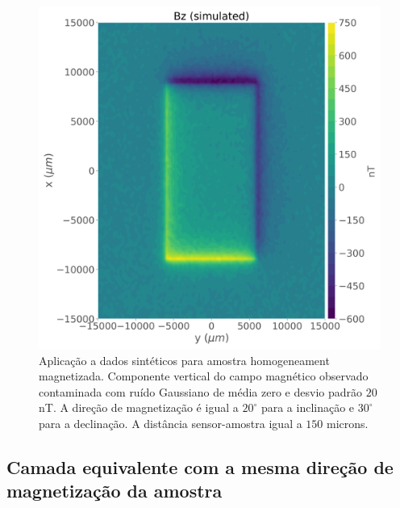 \begin{figure}
	\centering
	\includegraphics[width=.9\textwidth]{Fig/mag_vec/amostra_homo_correto/noisy_bz_sample.png}
	\caption{Aplicação a dados sintéticos para amostra homogeneament magnetizada. Componente vertical do campo magnético observado contaminada com ruído Gaussiano de média zero e desvio padrão $20$ nT. A direção de magnetização é igual a $20^\circ$ para a inclinação e $30^\circ$ para a declinação. A distância sensor-amostra igual a $150$ microns. }
	\label{fig:bz_homo_sample}
\end{figure}

\subsection{Camada equivalente com a mesma direção de magnetização da amostra}
\label{subsec:homo_same_dir}

